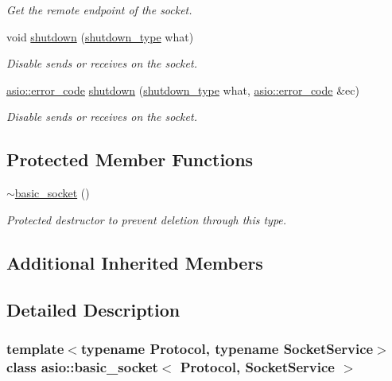\begin{DoxyCompactItemize}
\begin{DoxyCompactList}\small\item\em Get the remote endpoint of the socket. \end{DoxyCompactList}\item 
void \hyperlink{classasio_1_1basic__socket_af8b410b0be483ff3a9c03d67f754f02c}{shutdown} (\hyperlink{classasio_1_1socket__base_a915e52ff147efd296350bba81f795c37}{shutdown\+\_\+type} what)
\begin{DoxyCompactList}\small\item\em Disable sends or receives on the socket. \end{DoxyCompactList}\item 
\hyperlink{classasio_1_1error__code}{asio\+::error\+\_\+code} \hyperlink{classasio_1_1basic__socket_a7f07b5990a61e483ab24862912e695ae}{shutdown} (\hyperlink{classasio_1_1socket__base_a915e52ff147efd296350bba81f795c37}{shutdown\+\_\+type} what, \hyperlink{classasio_1_1error__code}{asio\+::error\+\_\+code} \&ec)
\begin{DoxyCompactList}\small\item\em Disable sends or receives on the socket. \end{DoxyCompactList}\end{DoxyCompactItemize}
\subsection*{Protected Member Functions}
\begin{DoxyCompactItemize}
\item 
\hyperlink{classasio_1_1basic__socket_a1c699e62d00ec43dab137ec4845c1532}{$\sim$basic\+\_\+socket} ()
\begin{DoxyCompactList}\small\item\em Protected destructor to prevent deletion through this type. \end{DoxyCompactList}\end{DoxyCompactItemize}
\subsection*{Additional Inherited Members}


\subsection{Detailed Description}
\subsubsection*{template$<$typename Protocol, typename Socket\+Service$>$class asio\+::basic\+\_\+socket$<$ Protocol, Socket\+Service $>$}

